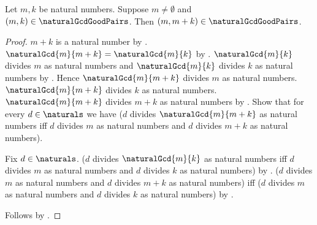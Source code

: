 \begin{theorem}\label{gcd_good_pair_sum_right}
    Let $m,k$ be natural numbers.
    Suppose $m\neq\emptyset$ and
        $(m,k)\in\naturalGcdGoodPairs$.
    Then $(m,m+k)\in\naturalGcdGoodPairs$.
\end{theorem}
\begin{proof}
    $m+k$ is a natural number by .
    $\naturalGcd{m}{m+k}=\naturalGcd{m}{k}$
        by .
    $\naturalGcd{m}{k}$ divides $m$ as natural numbers and
        $\naturalGcd{m}{k}$ divides $k$ as natural numbers
        by .
    Hence $\naturalGcd{m}{m+k}$ divides $m$ as natural numbers.
    $\naturalGcd{m}{m+k}$ divides $k$ as natural numbers.
    $\naturalGcd{m}{m+k}$ divides $m+k$ as natural numbers
        by .
    Show that for every $d\in\naturals$ we have
        ($d$ divides $\naturalGcd{m}{m+k}$ as natural numbers iff
         $d$ divides $m$ as natural numbers and
         $d$ divides $m+k$ as natural numbers).
    \begin{subproof}
        Fix $d\in\naturals$.
        ($d$ divides $\naturalGcd{m}{k}$ as natural numbers iff
         $d$ divides $m$ as natural numbers and
         $d$ divides $k$ as natural numbers)
            by .
        ($d$ divides $m$ as natural numbers and
         $d$ divides $m+k$ as natural numbers)
            iff
        ($d$ divides $m$ as natural numbers and
         $d$ divides $k$ as natural numbers)
            by .
    \end{subproof}
    Follows by .
\end{proof}

